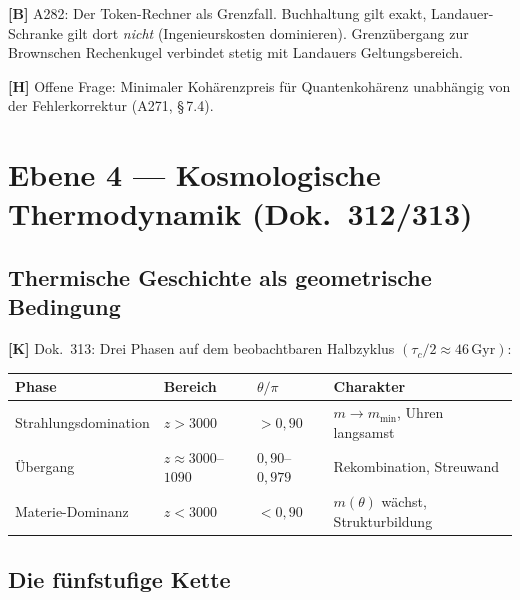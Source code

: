 \textbf{[B]} A282: Der Token-Rechner als Grenzfall. Buchhaltung gilt exakt,
Landauer-Schranke gilt dort \emph{nicht} (Ingenieurskosten dominieren).
Grenzübergang zur Brownschen Rechenkugel verbindet stetig mit Landauers
Geltungsbereich.

\textbf{[H]} Offene Frage: Minimaler Kohärenzpreis für Quantenkohärenz
unabhängig von der Fehlerkorrektur (A271, §\,7.4).

\section{Ebene 4 --- Kosmologische Thermodynamik (Dok.~312/313)}

\subsection{Thermische Geschichte als geometrische Bedingung}

\textbf{[K]} Dok.~313: Drei Phasen auf dem beobachtbaren Halbzyklus
$(\tau_c/2 \approx 46\,\text{Gyr})$:

\begin{center}
\small
\begin{tabular}{llll}
\toprule
Phase & Bereich & $\theta/\pi$ & Charakter \\
\midrule
Strahlungsdomination & $z > 3000$ & $> 0{,}90$ &
  $m \to m_\text{min}$, Uhren langsamst \\
Übergang & $z \approx 3000$--$1090$ & $0{,}90$--$0{,}979$ &
  Rekombination, Streuwand \\
Materie-Dominanz & $z < 3000$ & $< 0{,}90$ &
  $m(\theta)$ wächst, Strukturbildung \\
\bottomrule
\end{tabular}
\end{center}

\subsection{Die fünfstufige Kette}

